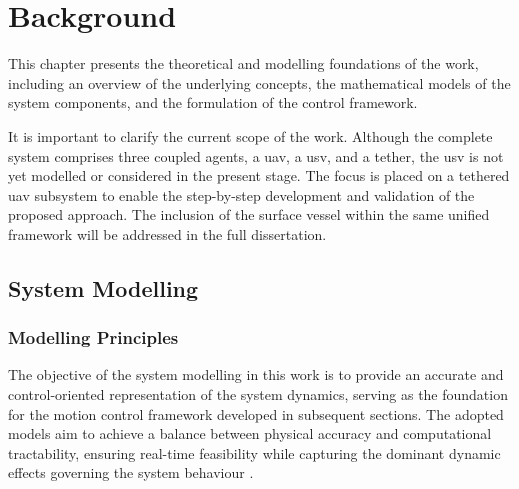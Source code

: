 

\chapter{Background}
\label{chapter:background}

This chapter presents the theoretical and modelling foundations of the work, including an overview of the underlying concepts, the mathematical models of the system components, and the formulation of the control framework.

It is important to clarify the current scope of the work. Although the complete system comprises three coupled agents, a \gls{uav}, a \gls{usv}, and a tether, the \gls{usv} is not yet modelled or considered in the present stage. The focus is placed on a tethered \gls{uav} subsystem to enable the step-by-step development and validation of the proposed approach. The inclusion of the surface vessel within the same unified framework will be addressed in the full dissertation.




\section{System Modelling}
\label{sec:theoretical_model_1}

\subsection{Modelling Principles}
\label{subsec:modelling_identification}

The objective of the system modelling in this work is to provide an accurate and control-oriented representation of the system dynamics, serving as the foundation for the motion control framework developed in subsequent sections. The adopted models aim to achieve a balance between physical accuracy and computational tractability, ensuring real-time feasibility while capturing the dominant dynamic effects governing the system behaviour \citep{modeling_Silva}.

